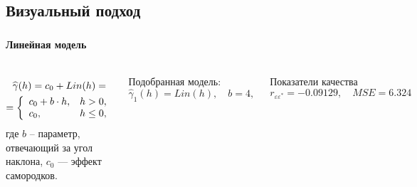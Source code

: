 \documentclass[notheorems]{beamer}
\theoremstyle{definition}
\theoremstyle{example}
\theoremstyle{plain}
\begin{document}
\subsection{Визуальный подход}%

\begin{frame}
  \frametitle{\large\subsecname}
  \framesubtitle{Линейная модель}
  \begin{columns}[c]
  {\footnotesize
  \begin{equation}\begin{gathered}
  \label{eq:lin}
    \widehat{\gamma}(h) = c_0 + Lin(h) = \\
    = \left\{
   \begin{array}{l l}
     c_0 + b \cdot h, & h > 0, \\
     c_0, & h \leq 0,
   \end{array} \right.
  \end{gathered}\end{equation}
  где $ b $ -- параметр, отвечающий за угол наклона, $ c_0 $ --- эффект самородков.

  \vspace{0.5em}

  Подобранная модель:
  \begin{equation}
  \label{eq:gamma1}
    \widehat{\gamma}_1(h) = Lin(h), \quad b = 4,
  \end{equation}

  Показатели качества
  \begin{equation*}
    r_{\varepsilon\varepsilon^{*}} = -0.09129, \quad MSE = 6.324
  \end{equation*}
  }


\end{columns}
\end{frame}
\end{document}
